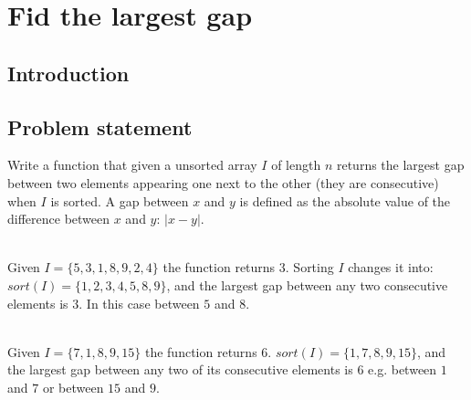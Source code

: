 


\chapter{Fid the largest gap}
\label{ch:max_gap}
\section*{Introduction}

\section{Problem statement}
\begin{exercise}
\label{example:max_gap:exercice1}
Write a function that given a unsorted array $I$ of length $n$ returns the
largest gap between two elements appearing one next to the other (they are consecutive) 
when $I$ is sorted.
A gap between $x$ and $y$ is defined as the absolute value of the difference between $x$ and $y$: $|x-y|$.

	\begin{example}
		\label{example:max_gap:example1}
		\hfill \\
		Given $I = \{5,3,1,8,9,2,4\}$ the function returns $3$. Sorting $I$ changes it into:
		$sort(I)= \{1,2,3,4,5,8,9\}$, and the largest gap between any two consecutive elements is $3$. In this case between $5$ and $8$.		
	\end{example}

	\begin{example}
		\label{example:max_gap:example2}
		\hfill \\
		Given $I = \{7, 1, 8, 9,15\}$ the function returns $6$.
		$sort(I)= \{1,7,8,9,15\}$, and the largest gap between any two of its consecutive elements is $6$ e.g. between $1$ and $7$ or between $15$ and $9$.	
	\end{example}
	
\end{exercise}

